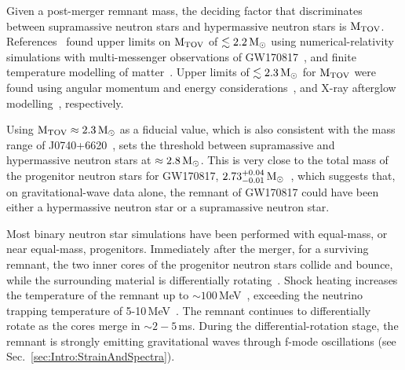 \documentclass[../Thesis.tex]{subfiles}
\begin{document}
    Given a post-merger remnant mass, the deciding factor that discriminates between supramassive neutron stars and hypermassive neutron stars is $\mathrm{M_{TOV}}$.
    References~\cite{Margalit2017,Rezzolla2018,Khadkikar2021} found upper limits on $\mathrm{M_{TOV}}$ of $\lesssim 2.2\,\mathrm{M}_{\odot}$ using numerical-relativity simulations with multi-messenger observations of GW170817~\cite{Margalit2017,Rezzolla2018}, and finite temperature modelling of matter~\cite{Khadkikar2021}. 
    Upper limits of $\lesssim 2.3\,\mathrm{M}_{\odot}$ for $\mathrm{M_{TOV}}$ were found using angular momentum and energy considerations~\cite{Shibata2019}, and X-ray afterglow modelling~\cite{Sarin2020}, respectively. \par
    Using $\mathrm{M_{TOV}}\approx 2.3\,\mathrm{M}_{\odot}$ as a fiducial value, which is also consistent with the mass range of J0740+6620~\cite{Cromartie2020}, sets the threshold between supramassive and hypermassive neutron stars at $\approx 2.8\,\mathrm{M}_{\odot}$. 
    This is very close to the total mass of the progenitor neutron stars for GW170817, $2.73^{+0.04}_{-0.01}\,\mathrm{M}_{\odot}$~\cite{GW170817Properties},  which suggests that, on gravitational-wave data alone, the remnant of GW170817 could have been either a hypermassive neutron star or a supramassive neutron star.\par
    
    Most binary neutron star simulations have been performed with equal-mass, or near equal-mass, progenitors.
    Immediately after the merger, for a surviving remnant, the two inner cores of the progenitor neutron stars collide and bounce, while the surrounding material is differentially rotating~\cite{Takami2015}.
    Shock heating increases the temperature of the remnant up to $\sim 100\,$MeV~\cite{Perego2019}, exceeding the neutrino trapping temperature of 5-10\,MeV~\cite{Alford2018b}.   
    The remnant continues to differentially rotate as the cores merge in $\sim 2-5\,$ms.
    During the differential-rotation stage, the remnant is strongly emitting gravitational waves through f-mode oscillations (see Sec.~\ref{sec:Intro:StrainAndSpectra}).
 \par
    
\end{document}
